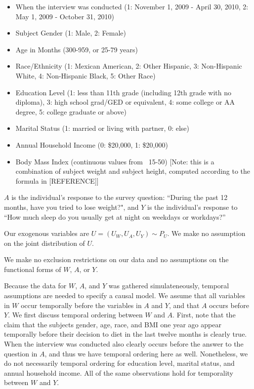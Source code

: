 \documentclass{article}
\begin{document}
\begin{itemize}
\item When the interview was conducted (1: November 1, 2009 - April 30, 2010, 2: May 1, 2009 - October 31, 2010)
\item Subject Gender (1: Male, 2: Female)
\item Age in Months (300-959, or 25-79 years)
\item Race/Ethnicity (1: Mexican American, 2: Other Hispanic, 3: Non-Hispanic White, 4: Non-Hispanic Black, 5: Other Race)
\item Education Level (1: less than 11th grade (including 12th grade with no diploma), 3: high school grad/GED or equivalent, 4: some college or AA degree, 5: college graduate or above)
\item Marital Status (1: married or living with partner, 0: else)
\item Annual Household Income (0: \$20,000, 1: \$20,000)
\item Body Mass Index (continuous values from ~15-50) [Note: this is a combination of subject weight and subject height, computed according to the formula in [REFERENCE]]
\end{itemize}

$A$ is the individual's response to the survey question: ``During the past 12 months, have you tried to lose weight?", and $Y$ is the individual's response to ``How much sleep do you usually get at night on weekdays or workdays?''  

Our exogenous variables are $U = (U_W, U_A, U_Y) \sim P_U$. We make no assumption on the joint distribution of $U$.  

We make no exclusion restrictions on our data and no assumptions on the functional forms of $W$, $A$, or $Y$.

Because the data for $W$, $A$, and $Y$ was gathered simulateneously, temporal assumptions are needed to specify a causal model. We assume that all variables in $W$ occur temporally before the variables in $A$ and $Y$, and that $A$ occurs before $Y$. We first discuss temporal ordering between $W$ and $A$. First, note that the claim that the subjects gender, age, race, and BMI one year ago appear temporally before their decision to diet in the last twelve months is clearly true. When the interview was conducted also clearly occurs before the answer to the question in $A$, and thus we have temporal ordering here as well. Nonetheless, we do not necessarily temporal ordering for education level, marital status, and annual household income. All of the same observations hold for temporality between $W$ and $Y$.
\end{document}
